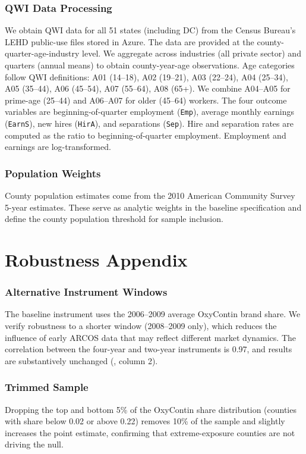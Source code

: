 \documentclass[12pt]{article}
\begin{document}
\subsubsection*{QWI Data Processing} We obtain QWI data for all 51 states (including DC) from the Census Bureau's LEHD public-use files stored in Azure. The data are provided at the county-quarter-age-industry level. We aggregate across industries (all private sector) and quarters (annual means) to obtain county-year-age observations. Age categories follow QWI definitions: A01 (14--18), A02 (19--21), A03 (22--24), A04 (25--34), A05 (35--44), A06 (45--54), A07 (55--64), A08 (65+). We combine A04--A05 for prime-age (25--44) and A06--A07 for older (45--64) workers. The four outcome variables are beginning-of-quarter employment (\texttt{Emp}), average monthly earnings (\texttt{EarnS}), new hires (\texttt{HirA}), and separations (\texttt{Sep}). Hire and separation rates are computed as the ratio to beginning-of-quarter employment. Employment and earnings are log-transformed.

\subsubsection*{Population Weights} County population estimates come from the 2010 American Community Survey 5-year estimates. These serve as analytic weights in the baseline specification and define the county population threshold for sample inclusion.


\section{Robustness Appendix}
\label{app:robust}

\subsubsection*{Alternative Instrument Windows} The baseline instrument uses the 2006--2009 average OxyContin brand share. We verify robustness to a shorter window (2008--2009 only), which reduces the influence of early ARCOS data that may reflect different market dynamics. The correlation between the four-year and two-year instruments is 0.97, and results are substantively unchanged (, column 2).

\subsubsection*{Trimmed Sample} Dropping the top and bottom 5\% of the OxyContin share distribution (counties with share below 0.02 or above 0.22) removes 10\% of the sample and slightly increases the point estimate, confirming that extreme-exposure counties are not driving the null.
\end{document}
